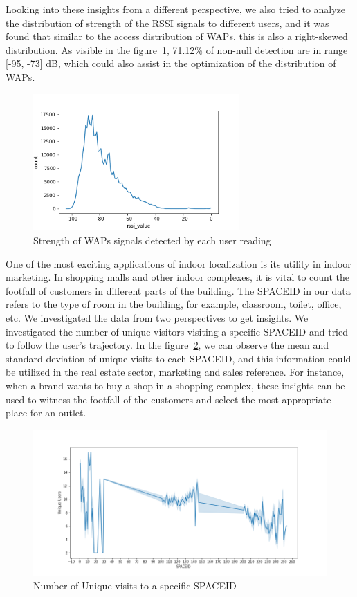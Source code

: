 \documentclass[a4paper,singleside,12pt]{report} %
\begin{document}
			Looking into these insights from a different perspective, we also tried to analyze the distribution of strength of the RSSI signals to different users, and it was found that similar to the access distribution of WAPs, this is also a right-skewed distribution. 
			As visible in the figure~\ref{fig4.6}, 71.12\% of non-null detection are in range [-95, -73] dB, which could also assist in the optimization of the distribution of WAPs.
	
			\begin{figure}[h!]
			\centerline{\includegraphics[width=0.7\textwidth]{./figures/rssi_distribution.png}}
			\caption{Strength of WAPs signals detected by each user reading}
			\label{fig4.6}
			\end{figure}
	
			One of the most exciting applications of indoor localization is its utility in indoor marketing. In shopping malls and other indoor complexes, it is vital to count the footfall of customers in different parts of the building. 
			The SPACEID in our data refers to the type of room in the building, for example, classroom, toilet, office, etc.
			We investigated the data from two perspectives to get insights. We investigated the number of unique visitors visiting a specific SPACEID and tried to follow the user's trajectory. 
			In the figure~\ref{fig4.7}, we can observe the mean and standard deviation of unique visits to each SPACEID, and this information could be utilized in the real estate sector, marketing and sales reference. 
			For instance, when a brand wants to buy a shop in a shopping complex, these insights can be used to witness the footfall of the customers and select the most appropriate place for an outlet.
	
			\begin{figure}[h!]
			\centerline{\includegraphics[width=1.2\textwidth]{./figures/user_by_spaceid_line_plot_training.png}}
			\caption{Number of Unique visits to a specific SPACEID}
			\label{fig4.7}
			\end{figure}
	
\end{document}
